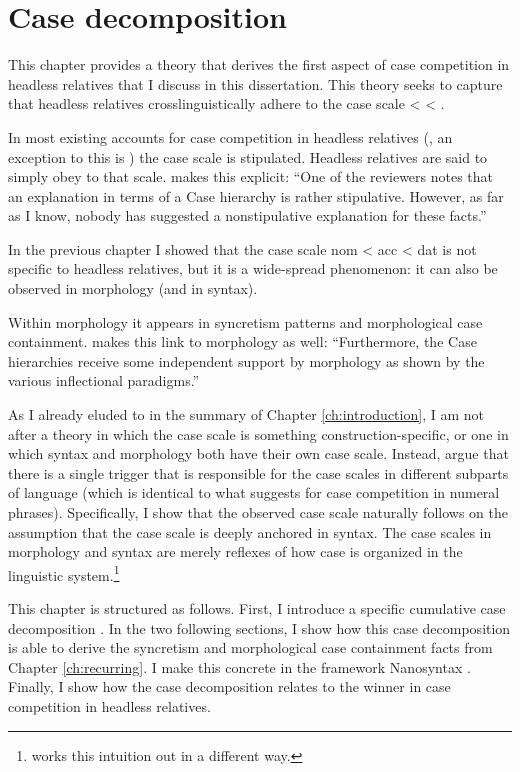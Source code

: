 
\chapter{Case decomposition}\label{ch:decomposition}

This chapter provides a theory that derives the first aspect of case competition in headless relatives that I discuss in this dissertation.
This theory seeks to capture that headless relatives crosslinguistically adhere to the case scale  <  < .

In most existing accounts for case competition in headless relatives (\citealt[cf.][]{pittner1995,vogel2001,grosu2003,harbert1978}, an exception to this is \citealt{himmelreich2017}) the case scale is stipulated. Headless relatives are said to simply obey to that scale.  makes this explicit: ``One of the reviewers notes that an explanation in terms of a Case hierarchy is rather stipulative. However, as far as I know, nobody has suggested a nonstipulative explanation for these facts.''

In the previous chapter I showed that the case scale \ac{nom} < \ac{acc} < \ac{dat} is not specific to headless relatives, but it is a wide-spread phenomenon: it can also be observed in morphology (and in syntax).

Within morphology it appears in syncretism patterns and morphological case containment.  makes this link to morphology as well: ``Furthermore, the Case hierarchies receive some independent support by morphology as shown by the various inflectional paradigms.''

As I already eluded to in the summary of Chapter \ref{ch:introduction}, I am not after a theory in which the case scale is something construction-specific, or one in which syntax and morphology both have their own case scale. Instead, argue that there is a single trigger that is responsible for the case scales in different subparts of language (which is identical to what \citealt{caha2019} suggests for case competition in numeral phrases). Specifically, I show that the observed case scale naturally follows on the assumption that the case scale is deeply anchored in syntax. The case scales in morphology and syntax are merely reflexes of how case is organized in the linguistic system.\footnote{
\citet{himmelreich2017} works this intuition out in a different way.
}

This chapter is structured as follows. First, I introduce a specific cumulative case decomposition \citep{caha2009}. In the two following sections, I show how this case decomposition is able to derive the syncretism and morphological case containment facts from Chapter \ref{ch:recurring}. I make this concrete in the framework Nanosyntax \citep{starke2009}. Finally, I show how the case decomposition relates to the winner in case competition in headless relatives.


